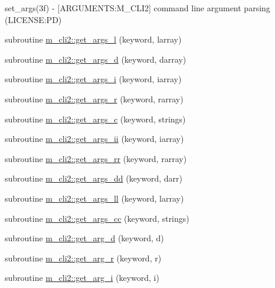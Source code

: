 \begin{DoxyCompactItemize}
\begin{DoxyCompactList}
set\+\_\+args(3f) -\/ \mbox{[}A\+R\+G\+U\+M\+E\+N\+TS\+:M\+\_\+\+C\+L\+I2\mbox{]} command line argument parsing (L\+I\+C\+E\+N\+SE\+:PD) \end{DoxyCompactList}\item 
subroutine \mbox{\hyperlink{namespacem__cli2_a686a6a56f17e9d4b12c2d039dab21ad4}{m\+\_\+cli2\+::get\+\_\+args\+\_\+l}} (keyword, larray)
\item 
subroutine \mbox{\hyperlink{namespacem__cli2_acf26ceafa7fdceb3824268713f2886b1}{m\+\_\+cli2\+::get\+\_\+args\+\_\+d}} (keyword, darray)
\item 
subroutine \mbox{\hyperlink{namespacem__cli2_a116734f2238340eb78d67998fe0ba683}{m\+\_\+cli2\+::get\+\_\+args\+\_\+i}} (keyword, iarray)
\item 
subroutine \mbox{\hyperlink{namespacem__cli2_a3f8bdb2a1156962e9d76f5705a16d889}{m\+\_\+cli2\+::get\+\_\+args\+\_\+r}} (keyword, rarray)
\item 
subroutine \mbox{\hyperlink{namespacem__cli2_a5c2f92a26d8dbec57ded73d9e29de686}{m\+\_\+cli2\+::get\+\_\+args\+\_\+c}} (keyword, strings)
\item 
subroutine \mbox{\hyperlink{namespacem__cli2_ac326d47897c388a1a25c0cd35a56c17b}{m\+\_\+cli2\+::get\+\_\+args\+\_\+ii}} (keyword, iarray)
\item 
subroutine \mbox{\hyperlink{namespacem__cli2_a14e6c8308ce631bf9da16e51b0ed8967}{m\+\_\+cli2\+::get\+\_\+args\+\_\+rr}} (keyword, rarray)
\item 
subroutine \mbox{\hyperlink{namespacem__cli2_ad81df3116ccbfb6891078a889a73d1f4}{m\+\_\+cli2\+::get\+\_\+args\+\_\+dd}} (keyword, darr)
\item 
subroutine \mbox{\hyperlink{namespacem__cli2_ac2f9f8815e15f33593443521ff4cf411}{m\+\_\+cli2\+::get\+\_\+args\+\_\+ll}} (keyword, larray)
\item 
subroutine \mbox{\hyperlink{namespacem__cli2_a07ab75edc4b65340919a625dc7defedb}{m\+\_\+cli2\+::get\+\_\+args\+\_\+cc}} (keyword, strings)
\item 
subroutine \mbox{\hyperlink{namespacem__cli2_ab2545d838b8ae3900c96212d6416bcbf}{m\+\_\+cli2\+::get\+\_\+arg\+\_\+d}} (keyword, d)
\item 
subroutine \mbox{\hyperlink{namespacem__cli2_a076c50e20e9ba13a40d9d0001436185a}{m\+\_\+cli2\+::get\+\_\+arg\+\_\+r}} (keyword, r)
\item 
subroutine \mbox{\hyperlink{namespacem__cli2_ab3678cd01c8b1cc9800e64f65c659db1}{m\+\_\+cli2\+::get\+\_\+arg\+\_\+i}} (keyword, i)
\item 

\end{DoxyCompactItemize}
